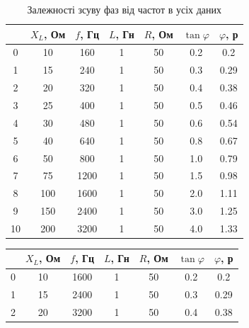 \documentclass[a4paper,12pt]{article}
\begin{document}
\begin{justify}
\begin{table}[htp]
\begin{flushright}
		\caption{Залежності зсуву фаз від частот в усіх даних }
	\end{flushright}
\centering

\begin{tabular}{|c|c|c|c|c|c|c|}
\hline
   & $X_L$, Ом & $f$, Гц & $L$, Гн & $R$, Ом & $\tan\varphi$ & $\varphi$, р \\ \hline
0  & 10        & 160     & 1       & 50      & 0.2           & 0.2          \\ \hline
1  & 15        & 240     & 1       & 50      & 0.3           & 0.29         \\ \hline
2  & 20        & 320     & 1       & 50      & 0.4           & 0.38         \\ \hline
3  & 25        & 400     & 1       & 50      & 0.5           & 0.46         \\ \hline
4  & 30        & 480     & 1       & 50      & 0.6           & 0.54         \\ \hline
5  & 40        & 640     & 1       & 50      & 0.8           & 0.67         \\ \hline
6  & 50        & 800     & 1       & 50      & 1.0           & 0.79         \\ \hline
7  & 75        & 1200    & 1       & 50      & 1.5           & 0.98         \\ \hline
8  & 100       & 1600    & 1       & 50      & 2.0           & 1.11         \\ \hline
9  & 150       & 2400    & 1       & 50      & 3.0           & 1.25         \\ \hline
10 & 200       & 3200    & 1       & 50      & 4.0           & 1.33         \\ \hline
\end{tabular}
\end{table}  
\begin{table}[htp]
\centering
\begin{tabular}{|c|c|c|c|c|c|c|}
\hline
   & $X_L$, Ом & $f$, Гц & $L$, Гн & $R$, Ом & $\tan\varphi$ & $\varphi$, р \\ \hline
0  & 10        & 1600    & 1       & 50      & 0.2           & 0.2          \\ \hline
1  & 15        & 2400    & 1       & 50      & 0.3           & 0.29         \\ \hline
2  & 20        & 3200    & 1       & 50      & 0.4           & 0.38         \\ \hline

\end{tabular}
\end{table}
\end{justify}
\end{document}
